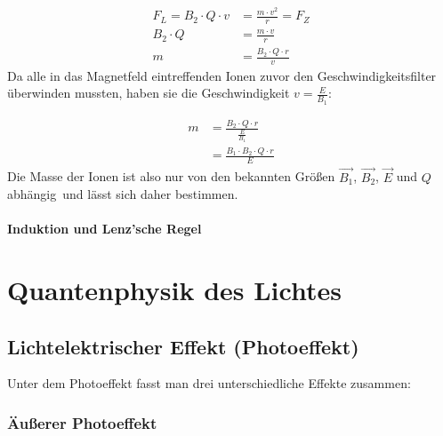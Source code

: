 \documentclass[a4paper]{article}
\begin{document}
				\begin{equation}
					\begin{aligned} 
						F_L=B_2\cdot Q \cdot v &= \frac{m\cdot v^2}{r} = F_Z\\
						B_2\cdot Q &= \frac{m\cdot v}{r}\\
						m&=\frac{B_2\cdot Q\cdot r}{v}
					\end{aligned}
				\end{equation}
				Da alle in das Magnetfeld eintreffenden Ionen zuvor den Geschwindigkeitsfilter überwinden mussten, haben sie die Geschwindigkeit $v=\frac{E}{B_1}$:
				
				\begin{equation}
				\begin{aligned}
					m&=\frac{B_2\cdot Q\cdot r}{\frac{E}{B_1}}\\
					&=\frac{B_1\cdot B_2\cdot Q\cdot r}{E}
				\end{aligned}
				\end{equation}
				Die Masse der Ionen ist also nur von den bekannten Größen $\vec{B_1}$, $\vec{B_2}$, $\vec{E}$ und $Q$ abhängig\ und lässt sich daher bestimmen.
				

				
			\paragraph{Induktion und Lenz'sche Regel}			%
		
	\section{Quantenphysik des Lichtes}
		\subsection{Lichtelektrischer Effekt (Photoeffekt)}
			Unter dem Photoeffekt fasst man drei unterschiedliche Effekte zusammen:
			\subsubsection{Äußerer Photoeffekt}
			
\end{document}
